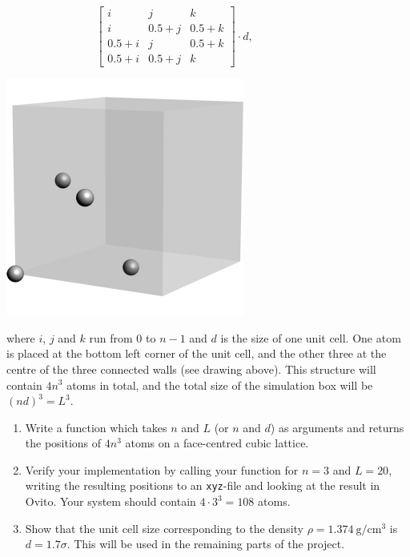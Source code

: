 \documentclass[11pt,british,a4paper]{report}
\begin{document}
\hspace{0.1\textwidth}
\begin{minipage}{0.4\textwidth}
    \centering
    \hfill
    \[
        \begin{bmatrix}
            i & j & k \\
            i & 0.5+j & 0.5+k \\
            0.5+i & j & 0.5+k \\
            0.5+i & 0.5+j & k
        \end{bmatrix}\cdot d,\qquad \qquad\qquad
    \]
\end{minipage}
\begin{minipage}{0.4\textwidth}
    \centering
    \includegraphics{fig.pdf}
\end{minipage}

where \(i\), \(j\) and \(k\) run from \(0\) to \(n-1\) and \(d\) is the size of one unit cell. One atom is placed at the bottom left corner of the unit cell, and the other three at
the centre of the three connected walls (see drawing above). This structure will contain \(4n^3\) atoms in total, and the total size of the simulation box will be $(nd)^3=L^3$.


\begin{enumerate}[label=\roman*.]
    \item Write a function which takes \(n\) and \(L\) (or \(n\) and \(d\)) as arguments and returns the positions of \(4n^3\) atoms on a face-centred cubic lattice.
    \item Verify your implementation by calling your function for \(n=3\) and \(L = 20\), writing the resulting positions to an \texttt{xyz}-file and looking at the result in Ovito. Your system should contain \(4\cdot3^3=108\) atoms.
    \item Show that the unit cell size corresponding to the density \(\rho=\SI{1.374}{\gram\per\cm\tothe3}\) is \(d=1.7 \sigma\). This will be used in the remaining parts of the project.
\end{enumerate}
\end{document}
